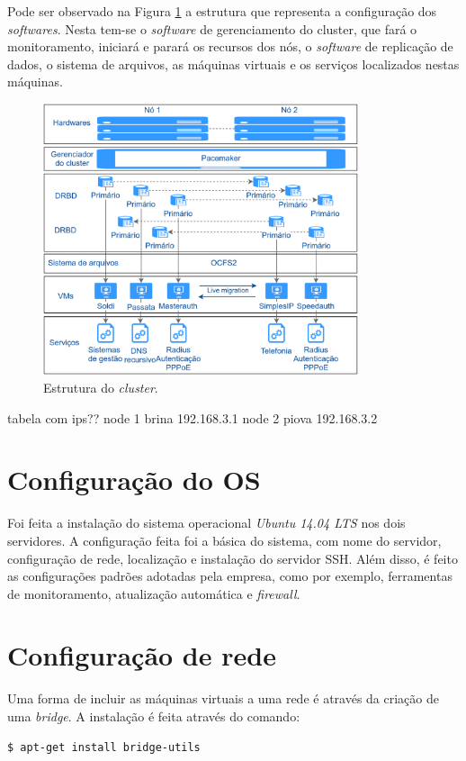Pode ser observado na Figura \ref{fig:projeto_estrutura} a estrutura que representa a configuração dos \textit{softwares}. Nesta tem-se o 
\textit{software} de gerenciamento do cluster, que fará o monitoramento, iniciará e parará os recursos dos nós, o \textit{software} de replicação 
de dados, o sistema de arquivos, as máquinas virtuais e os serviços localizados nestas máquinas.

\begin{figure}[h!]
 \centering
 \includegraphics[width=350px]{img/projeto_estrutura.eps}
 \caption{Estrutura do \textit{cluster}.}
 \label{fig:projeto_estrutura}
\end{figure}

tabela com ips??
node 1 brina 192.168.3.1
node 2 piova 192.168.3.2

\section{Configuração do \ac{OS}}

Foi feita a instalação do sistema operacional \textit{Ubuntu 14.04 \ac{LTS}} nos dois servidores. A configuração feita foi a básica do sistema,
com nome do servidor, configuração de rede, localização e instalação do servidor \ac{SSH}.
Além disso, é feito as configurações padrões adotadas pela empresa, como por exemplo, ferramentas de monitoramento, atualização automática
e \textit{firewall}.

\section{Configuração de rede}

Uma forma de incluir as máquinas virtuais a uma rede é através da criação de uma \textit{bridge}. A instalação é feita através do comando:
\begin{lstlisting}[language=bash]
  $ apt-get install bridge-utils
\end{lstlisting}

